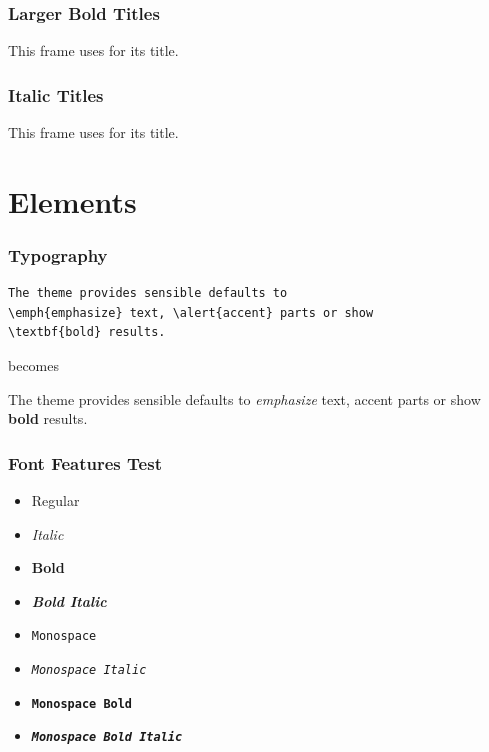 \documentclass[10pt,aspect-ratio=4:3]{ltx-talk}
\begin{document}
{
\begin{frame}
  \frametitle{Larger Bold Titles}
  This frame uses \texttt{\string\Large\string\bfseries} for its title.
\end{frame}
}

{
\begin{frame}
  \frametitle{Italic Titles}
  This frame uses \texttt{\string\large\string\itshape} for its title.
\end{frame}
}

\section{Elements}

\begin{frame*}
  \frametitle{Typography}
  \begin{verbatim}
The theme provides sensible defaults to
\emph{emphasize} text, \alert{accent} parts or show
\textbf{bold} results.
  \end{verbatim}
  \begin{center}
    becomes
  \end{center}
  The theme provides sensible defaults to \emph{emphasize} text,
  \alert{accent} parts or show \textbf{bold} results.
\end{frame*}

\begin{frame}
  \frametitle{Font Features Test}
  \begin{itemize}
    \item Regular
    \item \textit{Italic}
    \item \textbf{Bold}
    \item \textbf{\textit{Bold Italic}}
    \item \texttt{Monospace}
    \item \texttt{\textit{Monospace Italic}}
    \item \texttt{\textbf{Monospace Bold}}
    \item \texttt{\textbf{\textit{Monospace Bold Italic}}}
  \end{itemize}
\end{frame}
\end{document}
